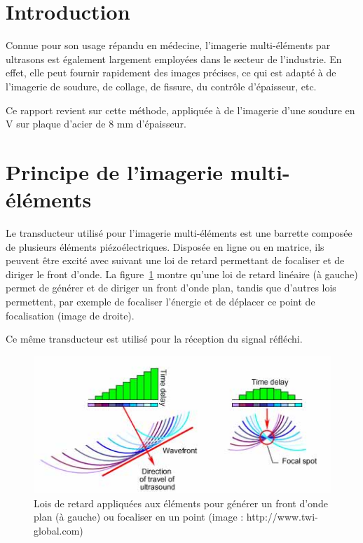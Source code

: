 \documentclass[twoside]{article}
\begin{document}
\begin{multicols}{2} %

\section{Introduction}

Connue pour son usage répandu en médecine, l'imagerie multi-éléments par ultrasons est également largement employées dans le secteur de l'industrie. En effet, elle peut fournir rapidement des images précises, ce qui est adapté à de l'imagerie de soudure, de collage, de fissure, du contrôle d'épaisseur, etc. 

Ce rapport revient sur cette méthode, appliquée à de l'imagerie d'une soudure en V sur plaque d'acier de 8 mm d'épaisseur.

\section{Principe de l'imagerie multi-éléments}

Le transducteur utilisé pour l'imagerie multi-éléments est une barrette composée de plusieurs éléments piézoélectriques. Disposée en ligne ou en matrice, ils peuvent être excité avec suivant une loi de retard permettant de focaliser et de diriger le front d'onde. La figure~\ref{multielements} montre qu'une loi de retard linéaire (à gauche) permet de générer et de diriger un front d'onde plan, tandis que d'autres lois permettent, par exemple de focaliser l'énergie et de déplacer ce point de focalisation (image de droite).

Ce même transducteur est utilisé pour la réception du signal réfléchi.

\begin{figure}[H]
	\includegraphics[scale=0.5]{images/principe.jpg}
		\caption{Lois de retard appliquées aux éléments pour générer un front d'onde plan (à gauche) ou focaliser en un point (image : http://www.twi-global.com)\label{multielements}}
\end{figure}


\end{multicols}
\end{document}
